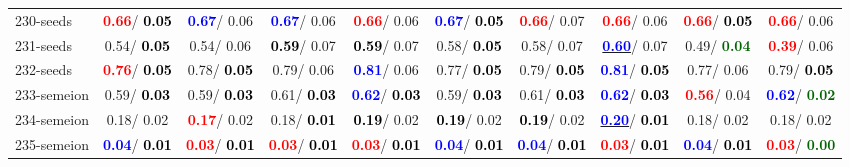 \begin{table}[h]
\begin{center}
{\begin{tabular}{lc|c|c|c|c|c|c|c|c}
230-seeds & \textcolor{red}{\textbf{  0.66}}/\textcolor{black}{\textbf{  0.05}} & \textcolor{blue}{\textbf{  0.67}}/  0.06 & \textcolor{blue}{\textbf{  0.67}}/  0.06 & \textcolor{red}{\textbf{  0.66}}/  0.06 & \textcolor{blue}{\textbf{  0.67}}/\textcolor{black}{\textbf{  0.05}} & \textcolor{red}{\textbf{  0.66}}/  0.07 & \textcolor{red}{\textbf{  0.66}}/  0.06 & \textcolor{red}{\textbf{  0.66}}/\textcolor{black}{\textbf{  0.05}} & \textcolor{red}{\textbf{  0.66}}/  0.06 \\
231-seeds &   0.54/\textcolor{black}{\textbf{  0.05}} &   0.54/  0.06 & \textcolor{black}{\textbf{  0.59}}/  0.07 & \textcolor{black}{\textbf{  0.59}}/  0.07 &   0.58/\textcolor{black}{\textbf{  0.05}} &   0.58/  0.07 & \underline{\textcolor{blue}{\textbf{  0.60}}}/  0.07 &   0.49/\textcolor{darkgreen}{\textbf{  0.04}} & \textcolor{red}{\textbf{  0.39}}/  0.06 \\ \hline
232-seeds & \textcolor{red}{\textbf{  0.76}}/\textcolor{black}{\textbf{  0.05}} &   0.78/\textcolor{black}{\textbf{  0.05}} &   0.79/  0.06 & \textcolor{blue}{\textbf{  0.81}}/  0.06 &   0.77/\textcolor{black}{\textbf{  0.05}} &   0.79/\textcolor{black}{\textbf{  0.05}} & \textcolor{blue}{\textbf{  0.81}}/\textcolor{black}{\textbf{  0.05}} &   0.77/  0.06 &   0.79/\textcolor{black}{\textbf{  0.05}} \\
233-semeion &   0.59/\textcolor{black}{\textbf{  0.03}} &   0.59/\textcolor{black}{\textbf{  0.03}} &   0.61/\textcolor{black}{\textbf{  0.03}} & \textcolor{blue}{\textbf{  0.62}}/\textcolor{black}{\textbf{  0.03}} &   0.59/\textcolor{black}{\textbf{  0.03}} &   0.61/\textcolor{black}{\textbf{  0.03}} & \textcolor{blue}{\textbf{  0.62}}/\textcolor{black}{\textbf{  0.03}} & \textcolor{red}{\textbf{  0.56}}/  0.04 & \textcolor{blue}{\textbf{  0.62}}/\textcolor{darkgreen}{\textbf{  0.02}} \\
234-semeion &   0.18/  0.02 & \textcolor{red}{\textbf{  0.17}}/  0.02 &   0.18/\textcolor{black}{\textbf{  0.01}} & \textcolor{black}{\textbf{  0.19}}/  0.02 & \textcolor{black}{\textbf{  0.19}}/  0.02 & \textcolor{black}{\textbf{  0.19}}/  0.02 & \underline{\textcolor{blue}{\textbf{  0.20}}}/\textcolor{black}{\textbf{  0.01}} &   0.18/  0.02 &   0.18/  0.02 \\
235-semeion & \textcolor{blue}{\textbf{  0.04}}/\textcolor{black}{\textbf{  0.01}} & \textcolor{red}{\textbf{  0.03}}/\textcolor{black}{\textbf{  0.01}} & \textcolor{red}{\textbf{  0.03}}/\textcolor{black}{\textbf{  0.01}} & \textcolor{red}{\textbf{  0.03}}/\textcolor{black}{\textbf{  0.01}} & \textcolor{blue}{\textbf{  0.04}}/\textcolor{black}{\textbf{  0.01}} & \textcolor{blue}{\textbf{  0.04}}/\textcolor{black}{\textbf{  0.01}} & \textcolor{red}{\textbf{  0.03}}/\textcolor{black}{\textbf{  0.01}} & \textcolor{blue}{\textbf{  0.04}}/\textcolor{black}{\textbf{  0.01}} & \textcolor{red}{\textbf{  0.03}}/\textcolor{darkgreen}{\textbf{  0.00}} \\

\end{tabular}}
\end{center}
\end{table}
